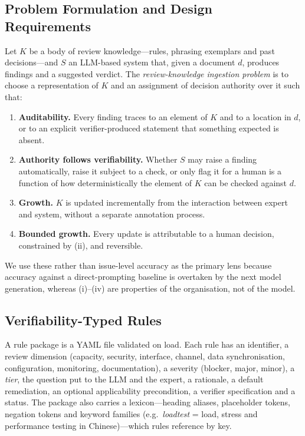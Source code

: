 \documentclass{IOS-Book-Article}
\begin{document}
\subsection{Problem Formulation and Design Requirements}

Let $K$ be a body of review knowledge---rules, phrasing exemplars and past decisions---and $S$ an LLM-based system that, given a document $d$, produces findings and a suggested verdict. The \emph{review-knowledge ingestion problem} is to choose a representation of $K$ and an assignment of decision authority over it such that:
\begin{enumerate}
\item[\textbf{(i)}] \textbf{Auditability.} Every finding traces to an element of $K$ and to a location in $d$, or to an explicit verifier-produced statement that something expected is absent.
\item[\textbf{(ii)}] \textbf{Authority follows verifiability.} Whether $S$ may raise a finding automatically, raise it subject to a check, or only flag it for a human is a function of how deterministically the element of $K$ can be checked against $d$.
\item[\textbf{(iii)}] \textbf{Growth.} $K$ is updated incrementally from the interaction between expert and system, without a separate annotation process.
\item[\textbf{(iv)}] \textbf{Bounded growth.} Every update is attributable to a human decision, constrained by (ii), and reversible.
\end{enumerate}
We use these rather than issue-level accuracy as the primary lens because accuracy against a direct-prompting baseline is overtaken by the next model generation, whereas (i)--(iv) are properties of the organisation, not of the model.

\subsection{Verifiability-Typed Rules}

A rule package is a YAML file validated on load. Each rule has an identifier, a review dimension (capacity, security, interface, channel, data synchronisation, configuration, monitoring, documentation), a severity (blocker, major, minor), a \emph{tier}, the question put to the LLM and the expert, a rationale, a default remediation, an optional applicability precondition, a verifier specification and a status. The package also carries a lexicon---heading aliases, placeholder tokens, negation tokens and keyword families (e.g.\ \emph{loadtest} = load, stress and performance testing in Chinese)---which rules reference by key.
\end{document}
